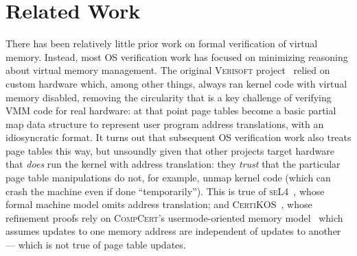 \section{Related Work}
\label{sec:relwork}

There has been relatively little prior work on formal verification of virtual memory.
Instead, most OS verification work has focused on minimizing reasoning about virtual memory management.
The original \textsc{Verisoft} project~\cite{alkassar2008verisoft,alkassar2010pervasive,alkassar2008formal,dalinger2005verification,hillebrand2005address,alkassar2008formal,starostin2010formal} 
relied on custom hardware which, among other things, always ran kernel code with virtual memory disabled, removing the circularity that is a key challenge of verifying 
VMM code for real hardware: at that point page tables become a basic partial map data structure to represent user program address translations,
with an idiosyncratic format. It turns out that subsequent OS verification work also treats page tables this way, but
unsoundly given that other projects target hardware that \emph{does} run the kernel with address translation: they \emph{trust}
that the particular page table manipulations do not, for example, unmap kernel code (which can crash the machine even if done ``temporarily'').
This is true of \textsc{seL4}~\cite{Klein2009seL4,seL4TOCS,Sewell2013translation}, whose formal machine model omits address translation;
and \textsc{CertiKOS}~\cite{gu15,gu2016certikos,gu2018certikos,chen2016interrupts}, whose refinement proofs rely on
\textsc{CompCert}'s usermode-oriented memory model~\cite{leroy2008formal,leroy2009formally} which assumes
updates to one memory address are independent of updates to another ---
which is not true of page table updates.

